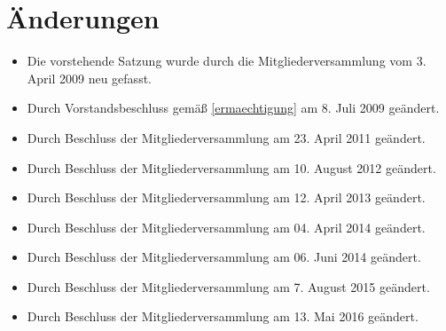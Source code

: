 \documentclass[a4paper, 12pt]{scrartcl}
\begin{document}
\section*{Änderungen}
\begin{itemize}
	\item Die vorstehende Satzung wurde durch die Mitgliederversammlung vom 3. April 2009 neu gefasst.
	\item Durch Vorstandsbeschluss gemäß \ref{ermaechtigung} am 8. Juli 2009 geändert.
	\item Durch Beschluss der Mitgliederversammlung am 23. April 2011 geändert.
	\item Durch Beschluss der Mitgliederversammlung am 10. August 2012 geändert.
	\item Durch Beschluss der Mitgliederversammlung am 12. April 2013 geändert.
	\item Durch Beschluss der Mitgliederversammlung am 04. April 2014 geändert.
	\item Durch Beschluss der Mitgliederversammlung am 06. Juni 2014 geändert.
	\item Durch Beschluss der Mitgliederversammlung am 7. August 2015 geändert.
	\item Durch Beschluss der Mitgliederversammlung am 13. Mai 2016 geändert.
\end{itemize}
\end{document}
